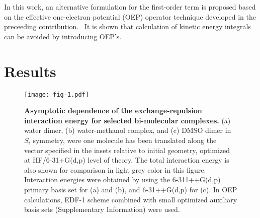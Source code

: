 In this work, an alternative formulation for the first\hyp{}order
term is proposed based on the effective one\hyp{}electron potential (OEP)
operator technique developed in the preceeding contribution.~\cite{Blasiak.Bednarska.Choluj.Bartkowiak.JCP.2019}
It is shown that calculation of kinetic energy integrals can be avoided
by introducing OEP's.

\section{Results}

%
\begin{figure}[t]
\texttt{[image: fig-1.pdf]}
\caption{\label{f:fig-1} {\bf Asymptotic dependence of the exchange\hyp{}repulsion interaction energy
for selected bi\hyp{}molecular complexes.} 
(a) water dimer, 
(b) water\hyp{}methanol complex, and 
(c) DMSO dimer in $S_i$ symmetry,
were one molecule has been translated
along the vector specified in the insets relative to initial geometry,
optimized at HF/6-31+G(d,p) level of theory.
The 
total interaction energy
is also shown for comparison in light grey color in this figure.
Interaction energies were obtained by using the 6-311++G(d,p)
primary basis set for (a) and (b), and 6-31++G(d,p) for (c).
In OEP calculations, EDF-1 scheme combined with small optimized auxiliary basis sets
(Supplementary Information) were used.
} 
\end{figure}
%

